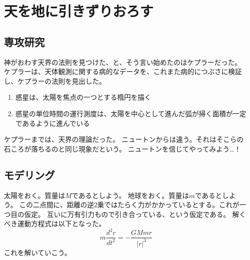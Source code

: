 \chapter{天を地に引きずりおろす}

\section{専攻研究}
神がおわす天界の法則を見つけた、と、そう言い始めたのはケプラーだった。
ケプラーは、天体観測に関する病的なデータを、これまた病的につぶさに検証し、ケプラーの法則を見出した。
\begin{enumerate}
  \item 惑星は、太陽を焦点の一つとする楕円を描く
  \item 惑星の単位時間の運行測度は、太陽を中心として進んだ弧が掃く面積が一定であるように進んでいる
\end{enumerate}

ケプラーまでは、天界の理論だった。
ニュートンからは違う。それはそこらの石ころが落ちるのと同じ現象だという。
ニュートンを信じてやってみよう…！



\section{モデリング}

太陽をおく。質量は$M$であるとしよう。
地球をおく。質量は$m$であるとしよう。
この二点間に、距離の逆2乗ではたらく力がかかっているとする。これが一つ目の仮定。
互いに万有引力もので引き合っている、という仮定である。
解くべき運動方程式は以下となった。
\[
  m\frac{d^2r}{dt^2} = -\frac{GMmr}{|r|^3}
\]
これを解いていこう。

